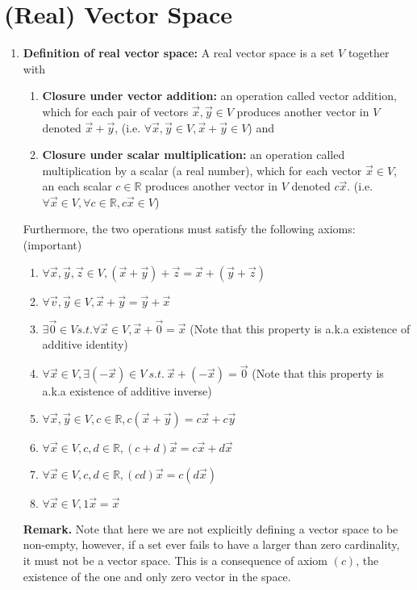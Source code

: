 \documentclass[oneside, 12pt]{book}
\newcommand{\settag}[1]{\renewcommand{\theenumi}{#1}}
\newcommand{\tbf}[1]{\textbf{#1}}
\begin{document}
\section{(Real) Vector Space}
\settag{1.1.1}
\begin{enumerate}
    \item{\textbf{Definition of real vector space:}} A real vector space is a set $V$ together with
    \begin{enumerate}
        \item \textbf{Closure under vector addition:} an operation called vector addition, which for each pair of vectors $\vec{x}, \vec{y}\in V$ produces another vector in $V$ denoted $\vec{x} + \vec{y}$, (i.e. $\forall \vec{x}, \vec{y}\in V, \vec{x} + \vec{y} \in V$) and
        \item \textbf{Closure under scalar multiplication:} an operation called multiplication by a scalar (a real number), which for each vector $\vec{x}\in V$, an each scalar $c\in \mathbb{R}$ produces another vector in $V$ denoted $c\vec{x}$. (i.e. $\forall \vec{x}\in V, \forall c \in \mathbb{R}, c \vec{x} \in V$)
    \end{enumerate}
    Furthermore, the two operations must satisfy the following axioms:(important)
    \begin{enumerate}
        \item $\forall \vec{x}, \vec{y}, \vec{z} \in V, (\vec{x} + \vec{y}) + \vec{z} = \vec{x} + (\vec{y} + \vec{z})$
        \item $\forall \vec{v}, \vec{y} \in V, \vec{x} + \vec{y} = \vec{y} + \vec{x}$
        \item $\exists \vec{0} \in V s.t. \forall \vec{x} \in V, \vec{x} + \vec{0} = \vec{x}$ (Note that this property is a.k.a existence of additive identity)
        \item $\forall \vec{x} \in V, \exists (-\vec{x}) \in V~s.t.~\vec{x} + (-\vec{x}) = \vec{0}$ (Note that this property is a.k.a existence of additive inverse)
        \item $\forall \vec{x}, \vec{y} \in V, c \in \mathbb{R}, c(\vec{x} + \vec{y}) = c\vec{x} + c\vec{y}$
        \item $\forall \vec{x} \in V, c,d \in \mathbb{R}, (c + d)\vec{x} = c\vec{x} + d\vec{x}$
        \item $\forall \vec{x} \in V, c,d \in \mathbb{R}, (cd)\vec{x} = c(d\vec{x})$
        \item $\forall \vec{x} \in V, 1\vec{x} = \vec{x}$
    \end{enumerate}
    \tbf{Remark.} Note that here we are not explicitly defining a vector space to be non-empty, however, if a set ever fails to have a larger than zero cardinality, it must not be a vector space. This is a consequence of axiom $(c)$, the existence of the one and only zero vector in the space.
    

\end{enumerate}
\end{document}

